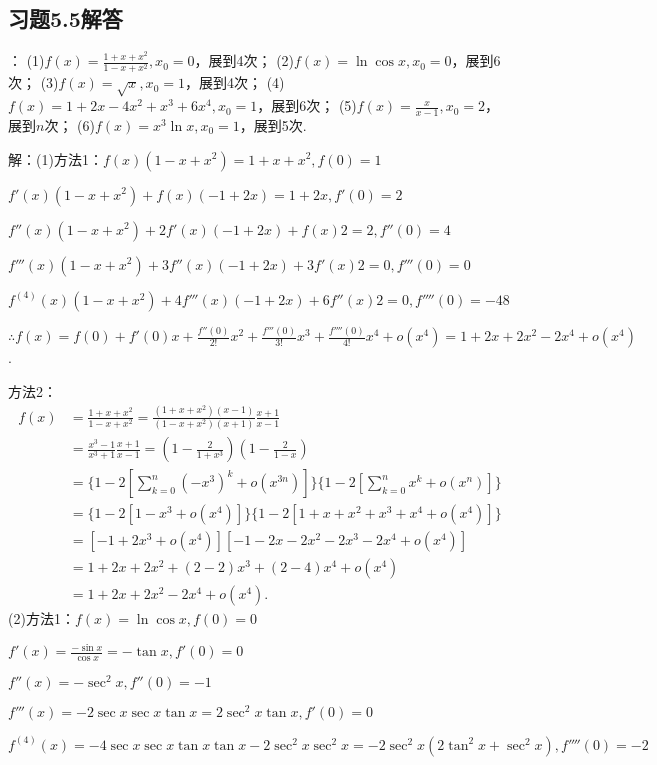 \documentclass[12pt,UTF8]{ctexart}
\begin{document}
\subsection{习题5.5解答}
\begin{enumerate}
：
\newline
(1)$f(x)=\frac{1+x+x^2}{1-x+x^2},x_0=0$，展到4次；
\newline
(2)$f(x)=\ln\cos x,x_0=0$，展到6次；
\newline
(3)$f(x)=\sqrt x,x_0=1$，展到4次；
\newline
(4)$f(x)=1+2x-4x^2+x^3+6x^4,x_0=1$，展到6次；
\newline
(5)$f(x)=\frac x{x-1},x_0=2$，展到$n$次；
\newline
(6)$f(x)=x^3\ln x,x_0=1$，展到5次.

解：(1)方法1：$f(x)(1-x+x^2)=1+x+x^2,f(0)=1$

$f'(x)(1-x+x^2)+f(x)(-1+2x)=1+2x,f'(0)=2$

$f''(x)(1-x+x^2)+2f'(x)(-1+2x)+f(x)2=2,f''(0)=4$

$f'''(x)(1-x+x^2)+3f''(x)(-1+2x)+3f'(x)2=0,f'''(0)=0$

$f^{(4)}(x)(1-x+x^2)+4f'''(x)(-1+2x)+6f''(x)2=0,f''''(0)=-48$

$\therefore f(x)=f(0)+f'(0)x+\frac{f''(0)}{2!}x^2+\frac{f'''(0)}{3!}x^3+\frac{f''''(0)}{4!}x^4+o(x^4)=1+2x+2x^2-2x^4+o(x^4)$.

方法2：
\[\begin{split}
f(x)&=\frac{1+x+x^2}{1-x+x^2}=\frac{(1+x+x^2)(x-1)}{(1-x+x^2)(x+1)}\frac{x+1}{x-1}\\
&=\frac{x^3-1}{x^3+1}\frac{x+1}{x-1}=(1-\frac2{1+x^3})(1-\frac2{1-x})\\
&=\{1-2[\sum_{k=0}^n(-x^3)^k+o(x^{3n})]\}\{1-2[\sum_{k=0}^nx^k+o(x^n)]\}\\
&=\{1-2[1-x^3+o(x^4)]\}\{1-2[1+x+x^2+x^3+x^4+o(x^4)]\}\\
&=[-1+2x^3+o(x^4)][-1-2x-2x^2-2x^3-2x^4+o(x^4)]\\
&=1+2x+2x^2+(2-2)x^3+(2-4)x^4+o(x^4)\\
&=1+2x+2x^2-2x^4+o(x^4).
\end{split}\]
(2)方法1：$f(x)=\ln\cos x,f(0)=0$

$f'(x)=\frac{-\sin x}{\cos x}=-\tan x,f'(0)=0$

$f''(x)=-\sec^2x,f''(0)=-1$

$f'''(x)=-2\sec x\sec x\tan x=2\sec^2x\tan x,f'(0)=0$

$f^{(4)}(x)=-4\sec x\sec x\tan x\tan x-2\sec^2x\sec^2x=-2\sec^2x(2\tan^2x+\sec^2x),f''''(0)=-2$


\end{enumerate}
\end{document}

